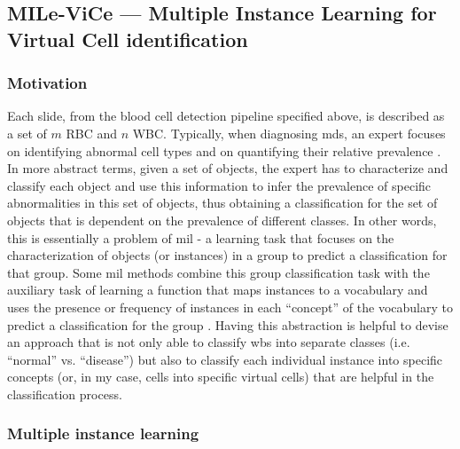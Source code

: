 \subsection{MILe-ViCe --- Multiple Instance Learning for Virtual Cell identification}

\subsubsection{Motivation}

Each slide, from the blood cell detection pipeline specified above, is described as a set of $m$ RBC and $n$ WBC. Typically, when diagnosing \ac{mds}, an expert focuses on identifying abnormal cell types and on quantifying their relative prevalence \cite{Valent2017-uh}. In more abstract terms, given a set of objects, the expert has to characterize and classify each object and use this information to infer the prevalence of specific abnormalities in this set of objects, thus obtaining a classification for the set of objects that is dependent on the prevalence of different classes. In other words, this is essentially a problem of \ac{mil} - a learning task that focuses on the characterization of objects (or instances) in a group to predict a classification for that group. Some \ac{mil} methods combine this group classification task with the auxiliary task of learning a function that maps instances to a vocabulary and uses the presence or frequency of instances in each “concept” of the vocabulary to predict a classification for the group \cite{Amores2013-ym}. Having this abstraction is helpful to devise an approach that is not only able to classify \ac{wbs} into separate classes (i.e. “normal” vs. “disease”) but also to classify each individual instance into specific concepts (or, in my case, cells into specific virtual cells) that are helpful in the classification process. 

\subsubsection{Multiple instance learning}

